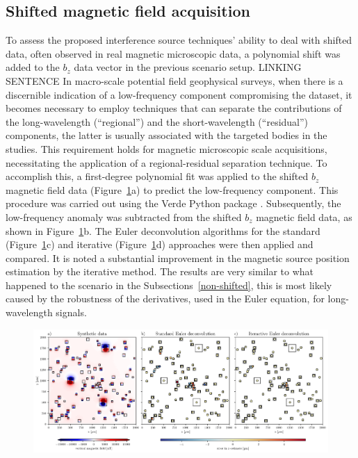 \subsection{Shifted magnetic field acquisition}

To assess the proposed interference source techniques' ability to deal with shifted data, often observed in real magnetic microscopic data, a polynomial shift was added to the $b_z$ data vector in the previous scenario setup. 
LINKING SENTENCE
In macro-scale potential field geophysical surveys, when there is a discernible indication of a low-frequency component compromising the dataset, it becomes necessary to employ techniques that can separate the contributions of the long-wavelength (``regional'') and the short-wavelength (``residual'') components, the latter is usually associated with the targeted bodies in the studies. This requirement holds for magnetic microscopic scale acquisitions, necessitating the application of a regional-residual separation technique. To accomplish this, a first-degree polynomial fit was applied to the shifted $b_z$ magnetic field data (Figure~\ref{euler2}a) to predict the low-frequency component. This procedure was carried out using the Verde Python package \citep{verde2018}. Subsequently, the low-frequency anomaly was subtracted from the shifted $b_z$ magnetic field data, as shown in Figure~\ref{euler2}b. The Euler deconvolution algorithms for the standard (Figure~\ref{euler2}c) and iterative (Figure~\ref{euler2}d) approaches were then applied and compared. It is noted a substantial improvement in the magnetic source position estimation by the iterative method. The results are very similar to what happened to the scenario in the Subsections~\ref{non-shifted}, this is most likely caused by the robustness of the derivatives, used in the Euler equation, for long-wavelength signals.

\begin{figure}[tb!]
  \centering
  \includegraphics[width=1\linewidth]{figures/euler-comparion-2.png}
  \caption{
      }
  \label{euler2}
\end{figure}


